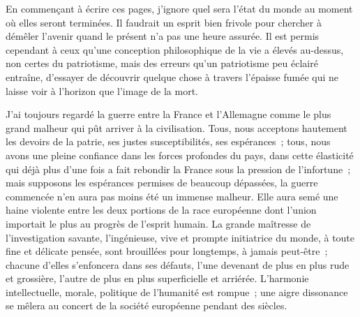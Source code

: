 \documentclass[french,twoside]{book} %
\newcommand{\dateline}[1]{\medskip{\RaggedLeft{#1}\par}\bigskip}
\begin{document}
\dateline{15 septembre 1870}
\noindent En commençant à écrire ces pages, j’ignore quel sera l’état du monde au moment où elles seront terminées. Il faudrait un esprit bien frivole pour chercher à démêler l’avenir quand le présent n’a pas une heure assurée. Il est permis cependant à ceux qu’une conception philosophique de la vie a élevés au-dessus, non certes du patriotisme, mais des erreurs qu’un patriotisme peu éclairé entraîne, d’essayer de découvrir quelque chose à travers l’épaisse fumée qui ne laisse voir à l’horizon que l’image de la mort.\par
J’ai toujours regardé la guerre entre la France et l’Allemagne comme le plus grand malheur qui pût arriver à la civilisation. Tous, nous acceptons hautement les devoirs de la patrie, ses justes susceptibilités, ses espérances ; tous, nous avons une pleine confiance dans les forces profondes du pays, dans cette élasticité qui déjà plus d’une fois a fait rebondir la France sous la pression de l’infortune ; mais supposons les espérances permises de beaucoup dépassées, la guerre commencée n’en aura pas moins été un immense malheur. Elle aura semé une haine violente entre les deux portions de la race européenne dont l’union importait le plus au progrès de l’esprit humain. La grande maîtresse de l’investigation savante, l’ingénieuse, vive et prompte initiatrice du monde, à toute fine et délicate pensée, sont brouillées pour longtemps, à jamais peut-être ; chacune d’elles s’enfoncera dans ses défauts, l’une devenant de plus en plus rude et grossière, l’autre de plus en plus superficielle et arriérée. L’harmonie intellectuelle, morale, politique de l’humanité est rompue ; une aigre dissonance se mêlera au concert de la société européenne pendant des siècles.\par
\end{document}
